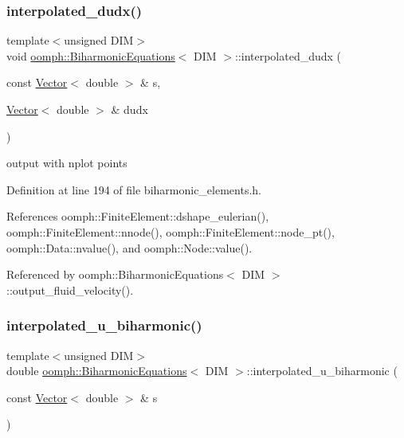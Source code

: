 \subsubsection{\texorpdfstring{interpolated\+\_\+dudx()}{interpolated\_dudx()}}
{\footnotesize\ttfamily template$<$unsigned D\+IM$>$ \\
void \hyperlink{classoomph_1_1BiharmonicEquations}{oomph\+::\+Biharmonic\+Equations}$<$ D\+IM $>$\+::interpolated\+\_\+dudx (\begin{DoxyParamCaption}\item[{const \hyperlink{classoomph_1_1Vector}{Vector}$<$ double $>$ \&}]{s,  }\item[{\hyperlink{classoomph_1_1Vector}{Vector}$<$ double $>$ \&}]{dudx }\end{DoxyParamCaption})\hspace{0.3cm}{\ttfamily [inline]}}



output with nplot points 



Definition at line 194 of file biharmonic\+\_\+elements.\+h.



References oomph\+::\+Finite\+Element\+::dshape\+\_\+eulerian(), oomph\+::\+Finite\+Element\+::nnode(), oomph\+::\+Finite\+Element\+::node\+\_\+pt(), oomph\+::\+Data\+::nvalue(), and oomph\+::\+Node\+::value().



Referenced by oomph\+::\+Biharmonic\+Equations$<$ D\+I\+M $>$\+::output\+\_\+fluid\+\_\+velocity().

\mbox{\label{classoomph_1_1BiharmonicEquations_ac0fddc16dbe7c8bbfeea76beeba88e46}} 
\subsubsection{\texorpdfstring{interpolated\+\_\+u\+\_\+biharmonic()}{interpolated\_u\_biharmonic()}}
{\footnotesize\ttfamily template$<$unsigned D\+IM$>$ \\
double \hyperlink{classoomph_1_1BiharmonicEquations}{oomph\+::\+Biharmonic\+Equations}$<$ D\+IM $>$\+::interpolated\+\_\+u\+\_\+biharmonic (\begin{DoxyParamCaption}\item[{const \hyperlink{classoomph_1_1Vector}{Vector}$<$ double $>$ \&}]{s }\end{DoxyParamCaption})\hspace{0.3cm}{\ttfamily [inline]}}



